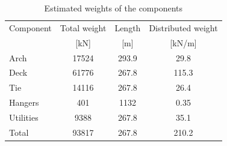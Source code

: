 \begin{table}[H]
\centering
\begin{tabular}{lccc}
\hline
Component & Total weight & Length  & Distributed weight \\
          & {[}kN{]}     & {[}m{]} & {[}kN/m{]}         \\ \hline
Arch      & \SI{17524}{}        & 293.9   & 29.8               \\
Deck      & \SI{61776}{}        & 267.8   & 115.3              \\
Tie       & \SI{14116}{}        & 267.8   & 26.4               \\
Hangers   & \SI{401}{}          & \SI{1132}{}    & 0.35               \\
Utilities & \SI{9388}{}         & 267.8   & 35.1               \\
Total     & \SI{93817}{}        & 267.8   & 210.2              \\ \hline
\end{tabular}
\caption{Estimated weights of the components}
\label{tab:weights}
\end{table}

